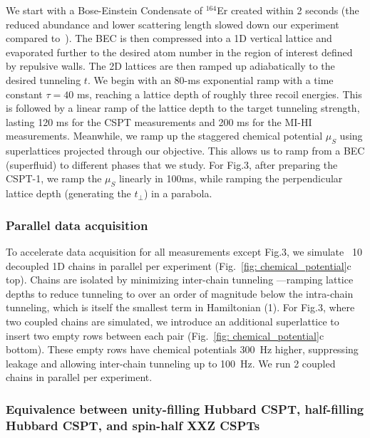 \documentclass[preprint,superscriptaddress,floatfix, nofootinbib]{revtex4-2}
\begin{document}
We start with a Bose-Einstein Condensate of $^{164}$Er created within 2 seconds (the reduced abundance and lower scattering length slowed down our experiment compared to~\cite{Phelps2020}). The BEC is then compressed into a 1D vertical lattice and evaporated further to the desired atom number in the region of interest defined by repulsive walls. The 2D lattices are then ramped up adiabatically to the desired tunneling $t$. We begin with an 80-ms exponential ramp with a time constant $\tau = 40$ ms, reaching a lattice depth of roughly three recoil energies. This is followed by a linear ramp of the lattice depth to the target tunneling strength, lasting 120 ms for the CSPT measurements and 200 ms for the MI-HI measurements. Meanwhile, we ramp up the staggered chemical potential $\mu_S$ using superlattices projected through our objective. This allows us to ramp from a BEC (superfluid) to different phases that we study. For Fig.3, after preparing the CSPT-1, we ramp the $\mu_S$ linearly in 100ms, while ramping the perpendicular lattice depth (generating the $t_\perp$) in a parabola.

\subsubsection*{Parallel data acquisition}

To accelerate data acquisition for all measurements except Fig.3, we simulate ~10 decoupled 1D chains in parallel per experiment (Fig.~\ref{fig: chemical_potential}c top). Chains are isolated by minimizing inter-chain tunneling ---ramping lattice depths to reduce tunneling to over an order of magnitude below the intra-chain tunneling, which is itself the smallest term in Hamiltonian (1). For Fig.3, where two coupled chains are simulated, we introduce an additional superlattice to insert two empty rows between each pair (Fig.~\ref{fig: chemical_potential}c bottom). These empty rows have chemical potentials 300~Hz higher, suppressing leakage and allowing inter-chain tunneling up to 100~Hz. We run 2 coupled chains in parallel per experiment.

\subsubsection*{Equivalence between unity-filling Hubbard CSPT, half-filling Hubbard CSPT, and spin-half XXZ CSPTs}
\end{document}
